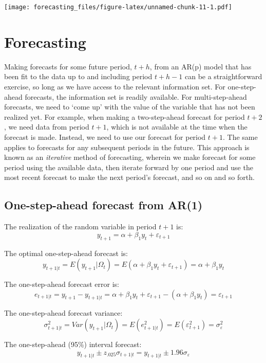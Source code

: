 \documentclass[
  oneside]{book}
\begin{document}
\texttt{[image: forecasting\_files/figure-latex/unnamed-chunk-11-1.pdf]}

\hypertarget{forecasting-2}{%
\section{Forecasting}\label{forecasting-2}}

Making forecasts for some future period, \(t+h\), from an AR(p) model that has been fit to the data up to and including period \(t+h-1\) can be a straightforward exercise, so long as we have access to the relevant information set. For one-step-ahead forecasts, the information set is readily available. For multi-step-ahead forecasts, we need to `come up' with the value of the variable that has not been realized yet. For example, when making a two-step-ahead forecast for period \(t+2\), we need data from period \(t+1\), which is not available at the time when the forecast is made. Instead, we need to use our forecast for period \(t+1\). The same applies to forecasts for any subsequent periods in the future. This approach is known as an \emph{iterative} method of forecasting, wherein we make forecast for some period using the available data, then iterate forward by one period and use the most recent forecast to make the next period's forecast, and so on and so forth.

\hypertarget{one-step-ahead-forecast-from-ar1}{%
\subsection{One-step-ahead forecast from AR(1)}\label{one-step-ahead-forecast-from-ar1}}

The realization of the random variable in period \(t+1\) is: \[y_{t+1} = \alpha + \beta_1 y_{t} + \varepsilon_{t+1}\]

The optimal one-step-ahead forecast is: \[y_{t+1|t} = E(y_{t+1}|\Omega_t) = E(\alpha + \beta_1 y_{t} + \varepsilon_{t+1}) = \alpha + \beta_1 y_{t}\]

The one-step-ahead forecast error is: \[e_{t+1|t} = y_{t+1} - y_{t+1|t} = \alpha + \beta_1 y_t + \varepsilon_{t+1} - (\alpha + \beta_1 y_t) = \varepsilon_{t+1}\]

The one-step-ahead forecast variance: \[\sigma_{t+1|t}^2 = Var(y_{t+1}|\Omega_t) = E(e_{t+1|t}^2) = E(\varepsilon_{t+1}^2) = \sigma_{\varepsilon}^2\]

The one-step-ahead (95\%) interval forecast: \[y_{t+1|t} \pm z_{.025}\sigma_{t+1|t} = y_{t+1|t} \pm 1.96\sigma_{\varepsilon}\]
\end{document}
